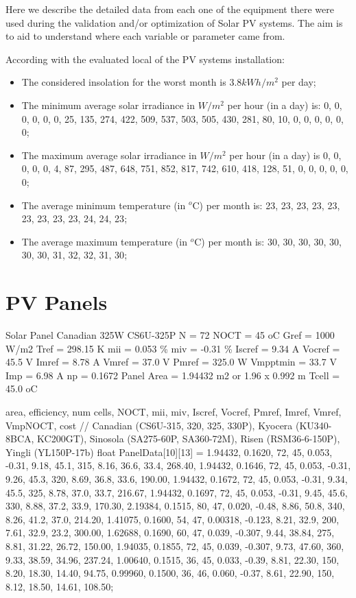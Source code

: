 Here we describe the detailed data from each one of the equipment there were used during the validation and/or optimization of Solar PV systems. The aim is to aid to understand where each variable or parameter came from.

According with the evaluated local of the PV systems installation:
\begin{itemize}
 \item The considered insolation for the worst month is $3.8 kWh/m^{2}$ per day;
 \item The minimum average solar irradiance in $W/m^{2}$ per hour (in a day) is:  {0, 0, 0, 0, 0, 0, 25, 135, 274, 422, 509, 537, 503, 505, 430, 281, 80, 10, 0, 0, 0, 0, 0, 0};
 \item The maximum average solar irradiance in $W/m^{2}$ per hour (in a day) is {0, 0, 0, 0, 0, 4, 87, 295, 487, 648, 751, 852, 817, 742, 610, 418, 128, 51, 0, 0, 0, 0, 0, 0};
 \item The average minimum temperature (in $^{o}$C) per month is: {23, 23, 23, 23, 23, 23, 23, 23, 23, 24, 24, 23};
 \item The average maximum temperature (in $^{o}$C) per month is: {30, 30, 30, 30, 30, 30, 30, 31, 32, 32, 31, 30};
\end{itemize} 

\section{PV Panels}

Solar Panel Canadian 325W CS6U-325P
N = 72
NOCT = 45 oC
Gref = 1000 W/m2
Tref = 298.15 K
mii = 0.053 \%
miv = -0.31 \%
Iscref = 9.34 A
Vocref = 45.5 V
Imref = 8.78 A
Vmref = 37.0 V
Pmref = 325.0 W
Vmpptmin = 33.7 V
Imp = 6.98 A
np = 0.1672
Panel Area = 1.94432 m2 or 1.96 x 0.992 m
Tcell = 45.0 oC

{area, efficiency, num cells, NOCT, mii, miv, Iscref, Vocref, Pmref, Imref, Vmref, VmpNOCT, cost} 
// Canadian (CS6U-315, 320, 325, 330P), Kyocera (KU340-8BCA, KC200GT), Sinosola (SA275-60P, SA360-72M), Risen (RSM36-6-150P), Yingli (YL150P-17b)
float PanelData[10][13] = {{1.94432, 0.1620, 72, 45, 0.053, -0.31, 9.18, 45.1, 315, 8.16, 36.6, 33.4, 268.40},
                          {1.94432, 0.1646, 72, 45, 0.053, -0.31, 9.26, 45.3, 320, 8.69, 36.8, 33.6, 190.00},
                          {1.94432, 0.1672, 72, 45, 0.053, -0.31, 9.34, 45.5, 325, 8.78, 37.0, 33.7, 216.67},
			  {1.94432, 0.1697, 72, 45, 0.053, -0.31, 9.45, 45.6, 330, 8.88, 37.2, 33.9, 170.30},
			  {2.19384, 0.1515, 80, 47, 0.020, -0.48, 8.86, 50.8, 340, 8.26, 41.2, 37.0, 214.20},
			  {1.41075, 0.1600, 54, 47, 0.00318, -0.123, 8.21, 32.9, 200, 7.61, 32.9, 23.2, 300.00},
			  {1.62688, 0.1690, 60, 47, 0.039, -0.307, 9.44, 38.84, 275, 8.81, 31.22, 26.72, 150.00},
			  {1.94035, 0.1855, 72, 45, 0.039, -0.307, 9.73, 47.60, 360, 9.33, 38.59, 34.96, 237.24},
			  {1.00640, 0.1515, 36, 45, 0.033, -0.39, 8.81, 22.30, 150, 8.20, 18.30, 14.40, 94.75},
			  {0.99960, 0.1500, 36, 46, 0.060, -0.37, 8.61, 22.90, 150, 8.12, 18.50, 14.61, 108.50}};

